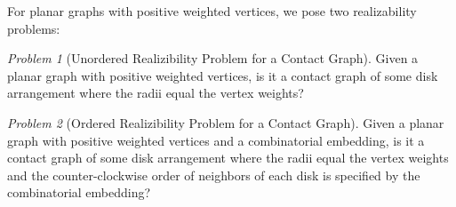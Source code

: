 \documentclass[10pt]{CSUNthesis}
\theoremstyle{plain}%
\theoremstyle{definition}
\theoremstyle{remark}
\newtheorem{prob}{Problem}
\newcommand{\DD}{{\cal D}} %
\renewcommand{\it}[1]{{\textit{#1}}}
\begin{document}


For planar graphs with positive weighted vertices, we pose two realizability problems:
\begin{prob}[Unordered Realizibility Problem for a Contact Graph]\label{problem:UnorderedContactGraph}
Given a planar graph with positive weighted vertices, is it a contact graph of some disk arrangement where the radii equal the vertex weights?
\end{prob}
\begin{prob}[Ordered Realizibility Problem for a Contact Graph]\label{problem:OrderedContactGraph}
Given a planar graph with positive weighted vertices and a combinatorial embedding, is it a contact graph of some disk arrangement where the radii equal the vertex weights and the counter-clockwise order of neighbors of each disk is specified by the combinatorial embedding?
\end{prob}
\end{document}
